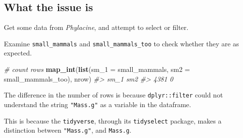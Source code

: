 \documentclass[]{book}
\newenvironment{Shaded}{}{}
\newcommand{\CommentTok}[1]{\textcolor[rgb]{0.38,0.63,0.69}{\textit{#1}}}
\newcommand{\DataTypeTok}[1]{\textcolor[rgb]{0.56,0.13,0.00}{#1}}
\newcommand{\DecValTok}[1]{\textcolor[rgb]{0.25,0.63,0.44}{#1}}
\newcommand{\KeywordTok}[1]{\textcolor[rgb]{0.00,0.44,0.13}{\textbf{#1}}}
\newcommand{\NormalTok}[1]{#1}
\newcommand{\OperatorTok}[1]{\textcolor[rgb]{0.40,0.40,0.40}{#1}}
\newcommand{\StringTok}[1]{\textcolor[rgb]{0.25,0.44,0.63}{#1}}
\begin{document}
\hypertarget{what-the-issue-is}{%
\subsection{What the issue is}\label{what-the-issue-is}}

Get some data from \emph{Phylacine}, and attempt to select or filter.

\begin{Shaded}
\end{Shaded}

\begin{Shaded}
\end{Shaded}

Examine \texttt{small\_mammals} and \texttt{small\_mammals\_too} to check whether they are as expected.

\begin{Shaded}
\begin{Highlighting}[]
\CommentTok{# count rows}
\KeywordTok{map_int}\NormalTok{(}\KeywordTok{list}\NormalTok{(}\DataTypeTok{sm_1 =}\NormalTok{ small_mammals, }\DataTypeTok{sm2 =}\NormalTok{ small_mammals_too),}
\NormalTok{        nrow)}
\CommentTok{#> sm_1  sm2 }
\CommentTok{#> 4381    0}
\end{Highlighting}
\end{Shaded}

The difference in the number of rows is because \texttt{dplyr::filter} could not understand the string \texttt{"Mass.g"} as a variable in the dataframe.

This is because the \texttt{tidyverse}, through its \texttt{tidyselect} package, makes a distinction between \texttt{"Mass.g"}, and \texttt{Mass.g}.
\end{document}
